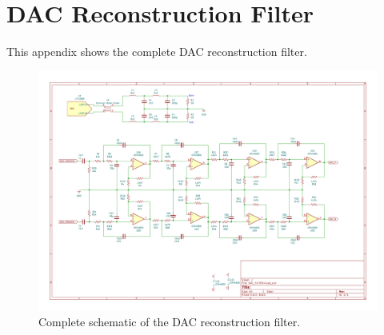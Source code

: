\chapter{DAC Reconstruction Filter} \label{App:DAC_FILTER}

This appendix shows the complete DAC reconstruction filter.

\begin{figure}[H]
    \centering
    \includegraphics[clip, trim=0 0 0 0, width=1\textwidth]{Appendix/Figures/DAC_FILTER_TOTAL.pdf}
    \caption{Complete schematic of the DAC reconstruction filter.}
    \label{fig_App_DAC_FILTER}
\end{figure}